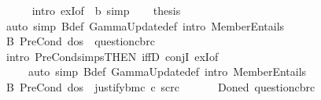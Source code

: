 \begin{isabellebody}
\ \ \ \ \isamarkupfalse%
\ {\isacharparenleft}{\kern0pt}intro\ exI{\isacharbrackleft}{\kern0pt}of\ {\isacharunderscore}{\kern0pt}\ b{\isacharbrackright}{\kern0pt}{\isacharparenright}{\kern0pt}\ simp\isanewline
\ \ \isamarkupfalse%
\ {\isacharquery}{\kern0pt}thesis\ \isamarkupfalse%
\ {\isacharparenleft}{\kern0pt}auto\ simp{\isacharcolon}{\kern0pt}\ {\isasymGamma}\isactrlsub B{\isacharunderscore}{\kern0pt}def\ GammaUpdate{\isacharunderscore}{\kern0pt}def\ intro{\isacharbang}{\kern0pt}{\isacharcolon}{\kern0pt}\ MemberEntails{\isacharparenright}{\kern0pt}\isanewline
{}\isamarkupfalse%
%
\endisatagproof
{\isafoldproof}%
%
\isadelimproof
\isanewline
%
\endisadelimproof
{}\isamarkupfalse%
\ B{}{\isacharcolon}{\kern0pt}\ {\isachardoublequoteopen}PreCond\ dos\ {\isasymGamma}\ question{\isacharbrackleft}{\kern0pt}c{\isacharcomma}{\kern0pt}b{\isacharcomma}{\kern0pt}r\isactrlsup c{\isacharbrackright}{\kern0pt}{\isachardoublequoteclose}\isanewline
%
\isadelimproof
\ \ %
\endisadelimproof
%
\isatagproof
{}\isamarkupfalse%
\ {\isacharparenleft}{\kern0pt}intro\ PreCond{\isachardot}{\kern0pt}simps{\isacharbrackleft}{\kern0pt}THEN\ iffD{}{\isacharbrackright}{\kern0pt}\ conjI\ exI{\isacharbrackleft}{\kern0pt}of\ {\isacharunderscore}{\kern0pt}\ {\isasymominus}{\isacharbrackright}{\kern0pt}{\isacharparenright}{\kern0pt}\isanewline
\ \ \ \ \ {\isacharparenleft}{\kern0pt}auto\ simp{\isacharcolon}{\kern0pt}\ {\isasymGamma}\isactrlsub B{\isacharunderscore}{\kern0pt}def\ GammaUpdate{\isacharunderscore}{\kern0pt}def\ intro{\isacharbang}{\kern0pt}{\isacharcolon}{\kern0pt}\ MemberEntails{\isacharparenright}{\kern0pt}%
\endisatagproof
{\isafoldproof}%
%
\isadelimproof
\isanewline
%
\endisadelimproof
{}\isamarkupfalse%
\ B{}{\isacharcolon}{\kern0pt}\ {\isachardoublequoteopen}PreCond\ dos\ {\isasymGamma}\ justify{\isacharbrackleft}{\kern0pt}b{\isacharcomma}{\kern0pt}m\isactrlsup c\ {\isasymand}\isactrlsup c\ s\isactrlsup c{\isasymturnstile}\isactrlsup {\isasymominus}r\isactrlsup c{\isacharbrackright}{\kern0pt}{\isachardoublequoteclose}\isanewline
%
\isadelimproof
%
\endisadelimproof
%
\isatagproof
{}\isamarkupfalse%
\ {\isacharminus}{\kern0pt}\isanewline
\ \ \isamarkupfalse%
\ {\isachardoublequoteopen}{\isasymGamma}\ {\isacharparenleft}{\kern0pt}Done\isactrlsup d\ question{\isacharbrackleft}{\kern0pt}c{\isacharcomma}{\kern0pt}b{\isacharcomma}{\kern0pt}r\isactrlsup c{\isacharbrackright}{\kern0pt}{\isacharparenright}{\kern0pt}{\isachardoublequoteclose}\ \isamarkupfalse%

\end{isabellebody}
